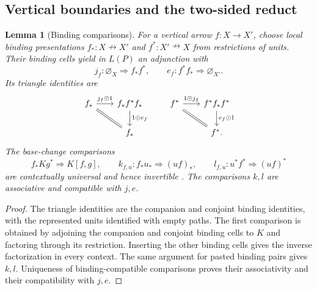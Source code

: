 \documentclass[11pt,a4paper]{article}
\newtheorem{lemma}[theorem]{Lemma}
\theoremstyle{definition}
\theoremstyle{remark}
\numberwithin{equation}{section}
\newcommand{\harr}{\mathrel{\nrightarrow}}
\newcommand{\cell}{\mathrel{\Longrightarrow}}
\newcommand{\wh}{\mathbin{\odot}}
\newcommand{\emp}[1]{\varnothing_{#1}}
\begin{document}
\subsection{Vertical boundaries and the two-sided reduct}\label{sec:global}

\begin{lemma}[Binding comparisons]\label{lem:bindings}
For a vertical arrow $f:X\to X'$, choose
local binding presentations $f_*:X\harr X'$ and $f^*:X'\harr X$ from
restrictions of units. Their binding cells yield in $L(P)$ an adjunction
with
\[
j_f:\emp X\cell f_*f^*,\qquad
e_f:f^*f_*\cell\emp{X'}.
\]
Its triangle identities are
\[
\begin{tikzcd}[column sep=2em]
f_* \arrow[r,"j_f\wh1"] \arrow[dr,equal] &
f_*f^*f_* \arrow[d,"1\wh e_f"]\\
& f_*
\end{tikzcd}
\qquad
\begin{tikzcd}[column sep=2em]
f^* \arrow[r,"1\wh j_f"] \arrow[dr,equal] &
f^*f_*f^* \arrow[d,"e_f\wh1"]\\
& f^* .
\end{tikzcd}
\]
The base-change comparisons
\[
f_*Kg^*\cell K[f,g],\qquad
k_{f,u}:f_*u_*\cell(uf)_*,\qquad
l_{f,u}:u^*f^*\cell(uf)^*
\]
are contextually universal and hence invertible
\cite[Theorem 7.16 and Corollary 7.19]{CS}. The comparisons $k,l$ are
associative and compatible with $j,e$.
\end{lemma}
\begin{proof}
The triangle identities are the companion and conjoint binding
identities, with the represented units identified with empty paths.
The first comparison is obtained by adjoining the companion and conjoint
binding cells to $K$ and factoring through its restriction. Inserting
the other binding cells gives the inverse factorization in every
context. The same argument for pasted binding pairs gives $k,l$.
Uniqueness of binding-compatible comparisons proves their associativity
and their compatibility with $j,e$.
\end{proof}
\end{document}
